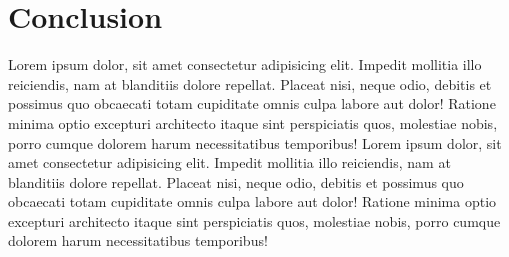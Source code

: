 \section{Conclusion}
	Lorem ipsum dolor, sit amet consectetur adipisicing elit. Impedit mollitia illo reiciendis, nam at blanditiis dolore repellat. Placeat nisi, neque odio, debitis et possimus quo obcaecati totam cupiditate omnis culpa labore aut dolor! Ratione minima optio excepturi architecto itaque sint perspiciatis quos, molestiae nobis, porro cumque dolorem harum necessitatibus temporibus! Lorem ipsum dolor, sit amet consectetur adipisicing elit. Impedit mollitia illo reiciendis, nam at blanditiis dolore repellat. Placeat nisi, neque odio, debitis et possimus quo obcaecati totam cupiditate omnis culpa labore aut dolor! Ratione minima optio excepturi architecto itaque sint perspiciatis quos, molestiae nobis, porro cumque dolorem harum necessitatibus temporibus!
